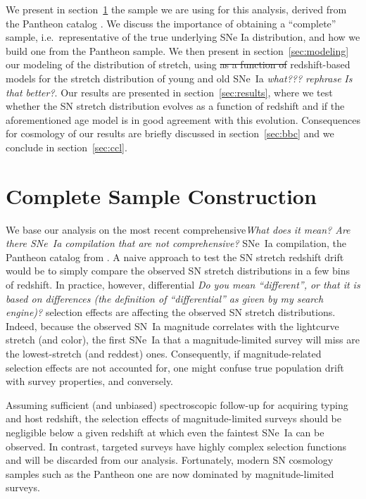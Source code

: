 \documentclass[]{aa} %
\newcommand{\nn}[1]{{\textcolor[rgb]{0.25, 0.50, 0}{#1}}}
\newcommand{\yc}[1]{{\textcolor{BrickRed}{#1}}}
\begin{document}
We present in section~\ref{sec:sample} the sample we are using for this
analysis, derived from the Pantheon catalog \citep{scolnic2018a}. We discuss the
importance of obtaining a ``complete'' sample, i.e.\ representative of the true
underlying SNe Ia distribution, and how we build one from the Pantheon sample.
We then present in section~\ref{sec:modeling} our modeling of the distribution
of stretch\nn{, using \sout{as a function of}} redshift\nn{-}based models for
the stretch distribution of young and old SNe~Ia \yc{\textit{what??? rephrase}}
\nn{\textit{Is that better?}}. Our results are presented in
section~\ref{sec:results}, where we test whether the SN stretch distribution
evolves as a function of redshift and if the aforementioned age model is in good
agreement with this evolution. Consequences for cosmology of our results are
briefly discussed in section~\ref{sec:bbc} and we conclude in
section~\ref{sec:ccl}.

\section{Complete Sample Construction}\label{sec:sample}

We base our analysis on the most recent \yc{comprehensive}\nn{\textit{What does
it mean? Are there SNe~Ia compilation that are not comprehensive?}} SNe~Ia
compilation, the Pantheon catalog from \cite{scolnic2018a}. A naive approach to
test the SN stretch redshift drift would be to simply compare the observed SN
stretch distributions in a few bins of redshift. In practice, however,
\yc{differential} \nn{\textit{Do you mean ``different'', or that it is based on
        differences (the definition of ``differential'' as given by my search
engine)?}} selection effects are affecting the observed SN stretch
distributions. Indeed, because the observed SN~Ia magnitude correlates with the
lightcurve stretch (and color), the first SNe~Ia that a magnitude-limited survey
will miss are the lowest-stretch (and reddest) ones. Consequently, if
magnitude-related selection effects are not accounted for, one might confuse
true population drift with survey properties, and conversely.

Assuming sufficient (and unbiased) spectroscopic follow-up for acquiring typing
and host redshift, the selection effects of magnitude-limited surveys should be
negligible below a given redshift at which even the faintest SNe~Ia can be
observed. In contrast, targeted surveys have highly complex selection functions
and will be discarded from our analysis. Fortunately, modern SN cosmology
samples such as the Pantheon one are now dominated by magnitude-limited
surveys.
\end{document}
